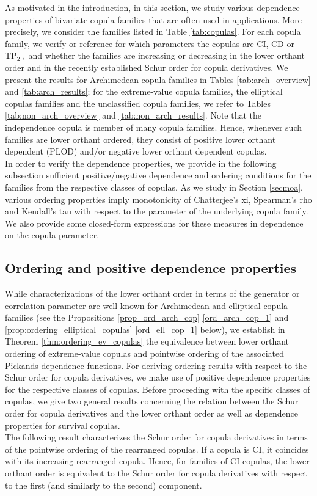 \documentclass{article}
\newcommand{\TP}{\mathrm{TP_2}}
\begin{document}
As motivated in the introduction, in this section, we study various dependence properties of bivariate copula families that are often used in applications.
More precisely, we consider the families listed in Table \ref{tab:copulas}.
For each copula family, we verify or reference for which parameters the copulas are CI, CD or \(\TP\,,\) and whether the families are increasing or decreasing in the lower orthant order and in the recently established Schur order for copula derivatives.
We present the results for Archimedean copula families in Tables \ref{tab:arch_overview} and \ref{tab:arch_results}; for the extreme-value copula families, the elliptical copulas families and the unclassified copula families, we refer to Tables \ref{tab:non_arch_overview} and \ref{tab:non_arch_results}. 
Note that the independence copula is member of many copula families. 
Hence, whenever such families are lower orthant ordered, they consist of positive lower orthant dependent (PLOD) and/or negative lower orthant dependent copulas. \\
In order to verify the dependence properties, we provide in the following subsection sufficient positive/negative dependence and ordering conditions for the families from the respective classes of copulas.
As we study in Section \ref{secmoa}, various ordering properties imply monotonicity of Chatterjee's xi, Spearman's rho and Kendall's tau with respect to the parameter of the underlying copula family.
We also provide some closed-form expressions for these measures in dependence on the copula parameter.

\subsection{Ordering and positive dependence properties}

While characterizations of the lower orthant order in terms of the generator or correlation parameter are well-known for Archimedean and elliptical copula families (see the Propositions \ref{prop_ord_arch_cop} \eqref{ord_arch_cop_1} and \ref{prop:ordering_elliptical_copulas} \eqref{ord_ell_cop_1} below), we establish in Theorem \ref{thm:ordering_ev_copulas} the equivalence between lower orthant ordering of extreme-value copulas and pointwise ordering of the associated Pickands dependence functions.
For deriving ordering results with respect to the Schur order for copula derivatives, we make use of positive dependence properties for the respective classes of copulas.
Before proceeding with the specific classes of copulas, we give two general results concerning the relation between the Schur order for copula derivatives and the lower orthant order as well as dependence properties for survival copulas.\\
The following result characterizes the Schur order for copula derivatives in terms of the pointwise ordering of the rearranged copulas.
If a copula is CI, it coincides with its increasing rearranged copula.
Hence, for families of CI copulas, the lower orthant order is equivalent to the Schur order for copula derivatives with respect to the first (and similarly to the second) component.
\end{document}
